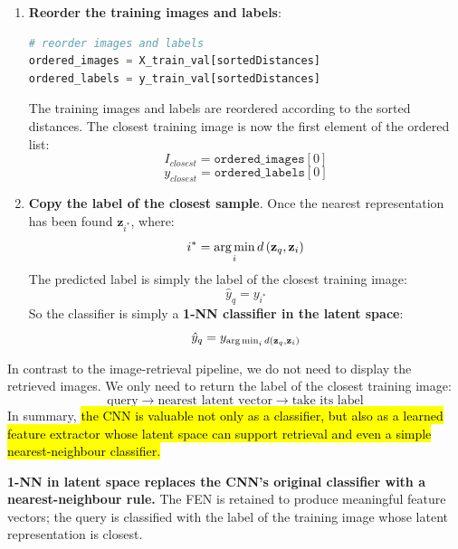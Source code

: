\begin{enumerate}
    \item \textbf{Reorder the training images and labels}:
    \begin{lstlisting}[language=Python]
# reorder images and labels
ordered_images = X_train_val[sortedDistances]
ordered_labels = y_train_val[sortedDistances]
\end{lstlisting}
    The training images and labels are reordered according to the sorted distances. The closest training image is now the first element of the ordered list:
    \begin{equation*}
        I_{closest} = \texttt{ordered\_images}[0]
    \end{equation*}
    \begin{equation*}
        y_{closest} = \texttt{ordered\_labels}[0]
    \end{equation*}


    \item \textbf{Copy the label of the closest sample}. Once the nearest representation has been found $\mathbf{z}_{i^*}$, where:
    \begin{equation*}
        i^* = \operatorname*{arg\,min}_{i} d\left(\mathbf{z}_q, \mathbf{z}_i\right)
    \end{equation*}
    The predicted label is simply the label of the closest training image:
    \begin{equation*}
        \hat{y}_q = y_{i^*}
    \end{equation*}
    So the classifier is simply a \textbf{1-NN classifier in the latent space}:
    \begin{equation*}
        \hat{y}_q = y_{\operatorname*{arg\,min}_{i} d\left(\mathbf{z}_q, \mathbf{z}_i\right)}
    \end{equation*}
\end{enumerate}
In contrast to the image-retrieval pipeline, we do not need to display the retrieved images. We only need to return the label of the closest training image:
\begin{equation*}
    \text{query} \to \text{nearest latent vector} \to \text{take its label}
\end{equation*}
In summary, \hl{the CNN is valuable not only as a classifier, but also as a learned feature extractor whose latent space can support retrieval and even a simple nearest-neighbour classifier.}

\highspace
\begin{takeawaysbox}
    \textbf{1-NN in latent space replaces the CNN's original classifier with a nearest-neighbour rule.} The FEN is retained to produce meaningful feature vectors; the query is classified with the label of the training image whose latent representation is closest.
\end{takeawaysbox}